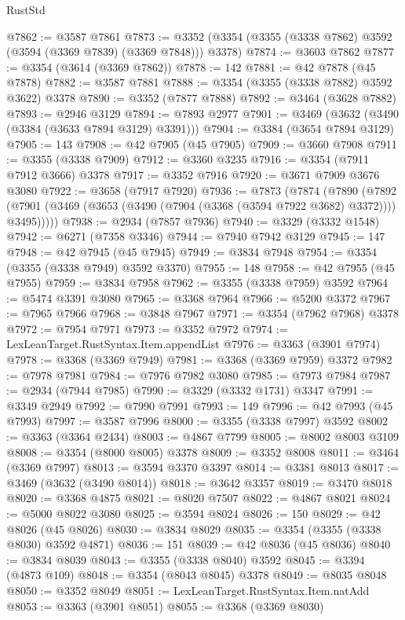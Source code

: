 \begin{lexlean}{RustStd}
\begin{coremodule}
@7862 := @3587 @7861
@7873 := @3352 (@3354 (@3355 (@3338 @7862) @3592 (@3594 (@3369 @7839) (@3369 @7848))) @3378)
@7874 := @3603 @7862
@7877 := @3354 (@3614 (@3369 @7862))
@7878 := 142
@7881 := @42 @7878 (@45 @7878)
@7882 := @3587 @7881
@7888 := @3354 (@3355 (@3338 @7882) @3592 @3622) @3378
@7890 := @3352 (@7877 @7888)
@7892 := @3464 (@3628 @7882)
@7893 := @2946 @3129
@7894 := @7893 @2977
@7901 := @3469 (@3632 (@3490 (@3384 (@3633 @7894 @3129) @3391)))
@7904 := @3384 (@3654 @7894 @3129)
@7905 := 143
@7908 := @42 @7905 (@45 @7905)
@7909 := @3660 @7908
@7911 := @3355 (@3338 @7909)
@7912 := @3360 @3235
@7916 := @3354 (@7911 @7912 @3666) @3378
@7917 := @3352 @7916
@7920 := @3671 @7909 @3676 @3080
@7922 := @3658 (@7917 @7920)
@7936 := @7873
    (@7874
      (@7890
        (@7892 (@7901 (@3469 (@3653 (@3490 (@7904 (@3368 (@3594 @7922 @3682) @3372)))) @3495)))))
@7938 := @2934 (@7857 @7936)
@7940 := @3329 (@3332 @1548)
@7942 := @6271 (@7358 @3346)
@7944 := @7940 @7942 @3129
@7945 := 147
@7948 := @42 @7945 (@45 @7945)
@7949 := @3834 @7948
@7954 := @3354 (@3355 (@3338 @7949) @3592 @3370)
@7955 := 148
@7958 := @42 @7955 (@45 @7955)
@7959 := @3834 @7958
@7962 := @3355 (@3338 @7959) @3592
@7964 := @5474 @3391 @3080
@7965 := @3368 @7964
@7966 := @5200 @3372
@7967 := @7965 @7966
@7968 := @3848 @7967
@7971 := @3354 (@7962 @7968) @3378
@7972 := @7954 @7971
@7973 := @3352 @7972
@7974 := LexLeanTarget.RustSyntax.Item.appendList
@7976 := @3363 (@3901 @7974)
@7978 := @3368 (@3369 @7949)
@7981 := @3368 (@3369 @7959) @3372
@7982 := @7978 @7981
@7984 := @7976 @7982 @3080
@7985 := @7973 @7984
@7987 := @2934 (@7944 @7985)
@7990 := @3329 (@3332 @1731) @3347
@7991 := @3349 @2949
@7992 := @7990 @7991
@7993 := 149
@7996 := @42 @7993 (@45 @7993)
@7997 := @3587 @7996
@8000 := @3355 (@3338 @7997) @3592
@8002 := @3363 (@3364 @2434)
@8003 := @4867 @7799
@8005 := @8002 @8003 @3109
@8008 := @3354 (@8000 @8005) @3378
@8009 := @3352 @8008
@8011 := @3464 (@3369 @7997)
@8013 := @3594 @3370 @3397
@8014 := @3381 @8013
@8017 := @3469 (@3632 (@3490 @8014))
@8018 := @3642 @3357
@8019 := @3470 @8018
@8020 := @3368 @4875
@8021 := @8020 @7507
@8022 := @4867 @8021
@8024 := @5000 @8022 @3080
@8025 := @3594 @8024
@8026 := 150
@8029 := @42 @8026 (@45 @8026)
@8030 := @3834 @8029
@8035 := @3354 (@3355 (@3338 @8030) @3592 @4871)
@8036 := 151
@8039 := @42 @8036 (@45 @8036)
@8040 := @3834 @8039
@8043 := @3355 (@3338 @8040) @3592
@8045 := @3394 (@4873 @109)
@8048 := @3354 (@8043 @8045) @3378
@8049 := @8035 @8048
@8050 := @3352 @8049
@8051 := LexLeanTarget.RustSyntax.Item.natAdd
@8053 := @3363 (@3901 @8051)
@8055 := @3368 (@3369 @8030)

\end{coremodule}
\end{lexlean}
